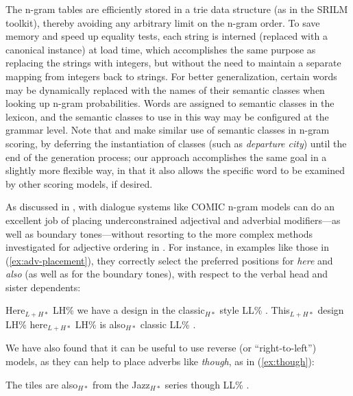 \documentclass[11pt]{article}
\newcommand{\eref}[2][]{(\ref{ex:#2}#1)} %
\begin{document}
The n-gram tables are efficiently stored in a trie data structure (as in
the SRILM toolkit), thereby avoiding any arbitrary limit on the n-gram
order. To save memory and speed up equality tests, each string is
interned (replaced with a canonical instance) at load time, which
accomplishes the same purpose as replacing the strings with integers,
but without the need to maintain a separate mapping from integers back
to strings. For better generalization, certain words may be dynamically
replaced with the names of their semantic classes when looking up n-gram
probabilities. Words are assigned to semantic classes in the lexicon,
and the semantic classes to use in this way may be configured at the
grammar level. Note that \cite{Oh/Rudnicky:2002} and \cite{Adwait:2002}
make similar use of semantic classes in n-gram scoring, by deferring the
instantiation of classes (such as \textit{departure city}) until the end
of the generation process; our approach accomplishes the same goal in a
slightly more flexible way, in that it also allows the specific word to
be examined by other scoring models, if desired.

As discussed in \cite{White-INLG:2004}, with dialogue systems like COMIC
n-gram models can do an excellent job of placing underconstrained
adjectival and adverbial modifiers---as well as boundary tones---without
resorting to the more complex methods investigated for adjective
ordering in \cite{Shaw/Hatzi:1999,Malouf:2000}. For instance, in
examples like those in \eref{adv-placement}, they correctly select the
preferred positions for \textit{here} and \textit{also} (as well as for
the boundary tones), with respect to the verbal head and sister
dependents:
 
\begin{exe}
  \ex \label{ex:adv-placement}
  \begin{xlist}
  \ex 
  Here$_{L+H*}$ LH\% we have a design in the classic$_{H*}$ style LL\% .
  \ex 
  This$_{L+H*}$ design LH\% here$_{L+H*}$ LH\% is also$_{H*}$ classic LL\% .
  \end{xlist}
\end{exe}

We have also found that it can be useful to use reverse (or
``right-to-left'') models, as they can help to place adverbs like
\textit{though}, as in \eref{though}:

\begin{exe}
  \ex \label{ex:though}
  The tiles are also$_{H*}$ from the Jazz$_{H*}$ series though LL\% .
\end{exe}
\end{document}
